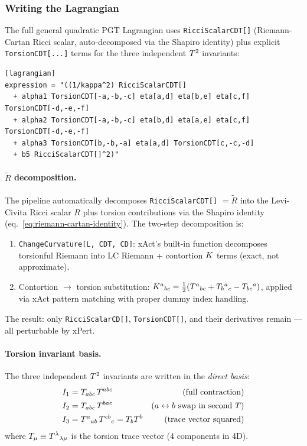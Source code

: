 \subsubsection{Writing the Lagrangian}
\label{sec:torsion-lagrangian}

The full general quadratic PGT Lagrangian uses \texttt{RicciScalarCDT[]} (Riemann-Cartan Ricci scalar, auto-decomposed via the Shapiro identity) plus explicit \texttt{TorsionCDT[...]} terms for the three independent $T^2$ invariants:

\begin{lstlisting}[style=toml]
[lagrangian]
expression = "((1/kappa^2) RicciScalarCDT[]
  + alpha1 TorsionCDT[-a,-b,-c] eta[a,d] eta[b,e] eta[c,f] TorsionCDT[-d,-e,-f]
  + alpha2 TorsionCDT[-a,-b,-c] eta[b,d] eta[a,e] eta[c,f] TorsionCDT[-d,-e,-f]
  + alpha3 TorsionCDT[b,-b,-a] eta[a,d] TorsionCDT[c,-c,-d]
  + b5 RicciScalarCDT[]^2)"
\end{lstlisting}

\paragraph{$\tilde{R}$ decomposition.}
\label{par:rtilde-decomposition}
The pipeline automatically decomposes \texttt{RicciScalarCDT[]} $= \tilde{R}$ into the Levi-Civita Ricci scalar $R$ plus torsion contributions via the Shapiro identity (eq.~\ref{eq:riemann-cartan-identity}).  The two-step decomposition is:
\begin{enumerate}
  \item \texttt{ChangeCurvature[L, CDT, CD]}: xAct's built-in function decomposes torsionful Riemann into LC Riemann + contortion $K$ terms (exact, not approximate).
  \item Contortion $\to$ torsion substitution: $K^a{}_{bc} = \tfrac{1}{2}(T^a{}_{bc} + T_b{}^a{}_c - T_{bc}{}^a)$, applied via xAct pattern matching with proper dummy index handling.
\end{enumerate}
The result: only \texttt{RicciScalarCD[]}, \texttt{TorsionCDT[]}, and their derivatives remain --- all perturbable by xPert.

\paragraph{Torsion invariant basis.}
\label{par:torsion-invariant-basis}
The three independent $T^2$ invariants are written in the \emph{direct basis}:
\begin{align}
  I_1 &= T_{abc}\,T^{abc}  &\text{(full contraction)} \label{eq:I1} \\
  I_2 &= T_{abc}\,T^{bac}  &\text{($a \leftrightarrow b$ swap in second $T$)} \label{eq:I2} \\
  I_3 &= T^a{}_{ab}\,T^{cb}{}_{c} = T_b T^b  &\text{(trace vector squared)} \label{eq:I3}
\end{align}
where $T_\mu \equiv T^\lambda{}_{\lambda\mu}$ is the torsion trace vector (4 components in 4D).

